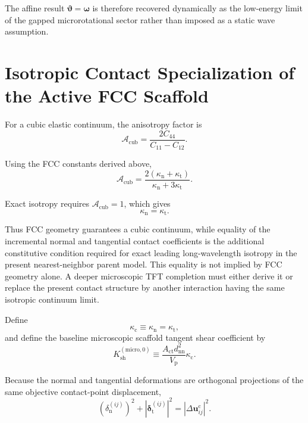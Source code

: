 The affine result $\boldsymbol{\vartheta}=\boldsymbol{\omega}$ is therefore recovered dynamically as the low-energy limit of the gapped microrotational sector rather than imposed as a static wave assumption.


\section{Isotropic Contact Specialization of the Active FCC Scaffold}
\label{sec:fcc_isotropy}

For a cubic elastic continuum, the anisotropy factor is
\begin{equation}
    \mathcal{A}_{\mathrm{cub}} = \frac{2C_{44}}{C_{11}-C_{12}}.
\end{equation}

Using the FCC constants derived above,
\begin{equation}
    \mathcal{A}_{\mathrm{cub}} = \frac{2\left(\kappa_{\mathrm{n}}+\kappa_{\mathrm{t}}\right)}{\kappa_{\mathrm{n}}+3\kappa_{\mathrm{t}}}.
\end{equation}

Exact isotropy requires $\mathcal{A}_{\mathrm{cub}}=1$, which gives
\begin{equation}
    \boxed{
    \kappa_{\mathrm{n}} = \kappa_{\mathrm{t}}.
    }
\end{equation}

Thus FCC geometry guarantees a cubic continuum, while equality of the incremental normal and tangential contact coefficients is the additional constitutive condition required for exact leading long-wavelength isotropy in the present nearest-neighbor parent model. This equality is not implied by FCC geometry alone. A deeper microscopic TFT completion must either derive it or replace the present contact structure by another interaction having the same isotropic continuum limit.

Define
\begin{equation}
    \kappa_{\mathrm{c}} \equiv \kappa_{\mathrm{n}} = \kappa_{\mathrm{t}},
\end{equation}
and define the baseline microscopic scaffold tangent shear coefficient by
\begin{equation}
    K_{\mathrm{sh}}^{(\mathrm{micro},0)} \equiv \frac{A_{\mathrm{ct}}d_{\mathrm{nn}}^2}{V_{\mathrm{p}}}\kappa_{\mathrm{c}}.
\end{equation}

Because the normal and tangential deformations are orthogonal projections of the same objective contact-point displacement,
\begin{equation}
    \left(\delta_{\mathrm{n}}^{(ij)}\right)^2
    +
    \left|\boldsymbol{\delta}_{\mathrm{t}}^{(ij)}\right|^2
    =
    \left|\Delta\mathbf{u}_{ij}^{\mathrm{c}}\right|^2.
\end{equation}

